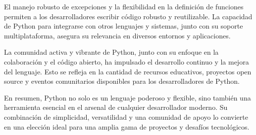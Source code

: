 \documentclass[10pt,a4paper]{article}
\begin{document}
El manejo robusto de excepciones y la flexibilidad en la definición de funciones permiten a los desarrolladores escribir código robusto y reutilizable. La capacidad de Python para integrarse con otros lenguajes y sistemas, junto con su soporte multiplataforma, asegura su relevancia en diversos entornos y aplicaciones.

La comunidad activa y vibrante de Python, junto con su enfoque en la colaboración y el código abierto, ha impulsado el desarrollo continuo y la mejora del lenguaje. Esto se refleja en la cantidad de recursos educativos, proyectos open source y eventos comunitarios disponibles para los desarrolladores de Python.

En resumen, Python no solo es un lenguaje poderoso y flexible, sino también una herramienta esencial en el arsenal de cualquier desarrollador moderno. Su combinación de simplicidad, versatilidad y una comunidad de apoyo lo convierte en una elección ideal para una amplia gama de proyectos y desafíos tecnológicos.
\end{document}
